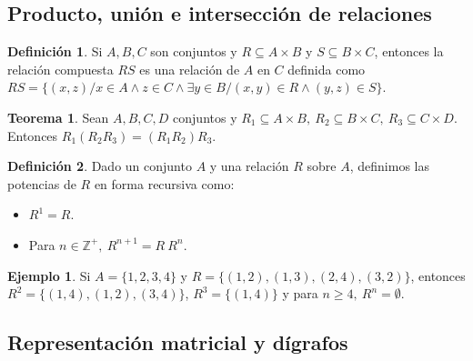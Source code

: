 \documentclass[10pt]{article}
\theoremstyle{definition}
\newtheorem{definition}{Definición}[section]
\newtheorem{theorem}{Teorema}[section]
\newtheorem{example}{Ejemplo}[section]
\begin{document}
\subsection{Producto, unión e intersección de relaciones}
\begin{definition}
	Si $A,B,C$ son conjuntos y $R\subseteq A\times B$ y $S\subseteq B\times C$, entonces la relación compuesta $RS$ es una relación de $A$ en $C$ definida como $RS=\{(x,z) / x\in A \wedge z\in C \wedge \exists y\in B / (x,y)\in R \wedge (y,z)\in S \}$.
\end{definition}
\begin{theorem}
	Sean $A,B,C,D$ conjuntos y $R_1\subseteq A\times B,\ R_2\subseteq B\times C,\ R_3\subseteq C\times D$.\\Entonces $R_1(R_2R_3)=(R_1R_2)R_3$.
\end{theorem}
\begin{definition}
	Dado un conjunto $A$ y una relación $R$ sobre $A$, definimos las potencias de $R$ en forma recursiva como:
	\begin{itemize}
		\item $R^1=R$.
		\item Para $n\in\mathbb{Z}^+,\ R^{n+1}=R\ R^n$.
	\end{itemize}
\end{definition}
\begin{example}
	Si $A=\{1,2,3,4\}$ y $R=\{(1,2),(1,3),(2,4),(3,2)\}$, entonces $R^2=\{(1,4),(1,2),(3,4)\}$, $R^3=\{(1,4)\}$ y para $n\ge4,\ R^n=\emptyset$.
\end{example}
\newpage\subsection{Representación matricial y dígrafos}
\end{document}
